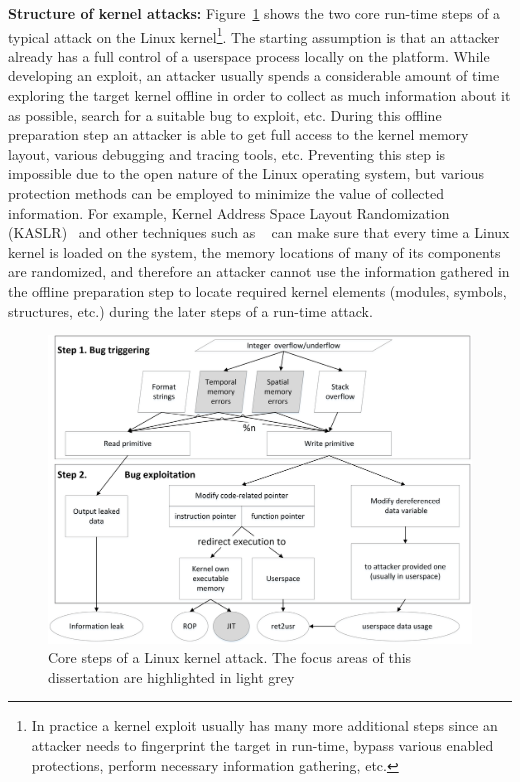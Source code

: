 \textbf{Structure of kernel attacks:}   Figure~\ref{fig:exploit-steps} shows the two core run-time steps of a typical attack on the Linux kernel\footnote{In practice a kernel exploit usually has many more additional steps since an attacker needs to fingerprint the target in run-time, bypass various enabled protections, perform necessary information gathering, etc.}. The starting assumption is that an attacker already has a full control of a userspace process locally on the platform. While developing an exploit, an attacker usually spends a considerable amount of time exploring the target kernel offline in order to collect as much information about it as possible, search for a suitable bug to exploit, etc. During this offline preparation step an attacker is able to get full access to the kernel memory layout, various debugging and tracing tools, etc. Preventing this step is impossible due to the open nature of the Linux operating system, but various protection methods can be employed to minimize the value of collected information. For example, Kernel Address Space Layout Randomization (KASLR)~\cite{cook2013} and other techniques such as ~\cite{randstruct2017} can make sure that every time a Linux kernel is loaded on the system, the memory locations of many of its components are randomized, and therefore an attacker cannot use the information gathered in the offline preparation step to locate required kernel elements (modules, symbols, structures, etc.) during the later steps of a run-time attack. 

\begin{figure}[t]
	\centering
		\includegraphics[width=1\textwidth]{figures/kernel_exploit_steps.png}
	\caption{Core steps of a Linux kernel attack. The focus areas of this dissertation are highlighted in light grey}
	\label{fig:exploit-steps}
\end{figure}    

